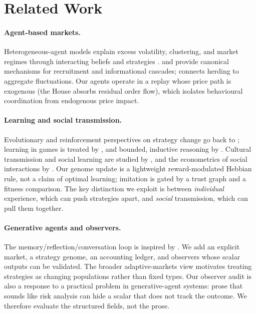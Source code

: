 \documentclass[11pt]{article}
\begin{document}
\section{Related Work}

\paragraph{Agent-based markets.}
Heterogeneous-agent models explain excess volatility, clustering, and market
regimes through interacting beliefs and strategies
\citep{hommes2006heterogeneous,lebaron2006agent}. \citet{kirman1993ants} and
\citet{bikhchandani1992theory} provide canonical mechanisms for recruitment and
informational cascades; \citet{cont2000herd} connects herding to aggregate
fluctuations. Our agents operate in a replay whose price path is exogenous (the
House absorbs residual order flow), which isolates behavioural coordination from
endogenous price impact.

\paragraph{Learning and social transmission.}
Evolutionary and reinforcement perspectives on strategy change go back to
\citet{holland1975adaptation}; learning in games is treated by
\citet{fudenberg1998theory}, and bounded, inductive reasoning by
\citet{arthur1994inductive}. Cultural transmission and social learning are
studied by \citet{boyd1985culture}, and the econometrics of social interactions
by \citet{manski2000economic}. Our genome update is a lightweight
reward-modulated Hebbian rule, not a claim of optimal learning; imitation is
gated by a trust graph and a fitness comparison. The key distinction we exploit is
between \emph{individual} experience, which can push strategies apart, and
\emph{social} transmission, which can pull them together.

\paragraph{Generative agents and observers.}
The memory/reflection/conversation loop is inspired by
\citet{park2023generative}. We add an explicit market, a strategy genome, an
accounting ledger, and observers whose scalar outputs can be validated. The
broader adaptive-markets view \citep{lo2004adaptive} motivates treating
strategies as changing populations rather than fixed types. Our observer audit
is also a response to a practical problem in generative-agent systems: prose that
sounds like risk analysis can hide a scalar that does not track the outcome. We
therefore evaluate the structured fields, not the prose.
\end{document}
